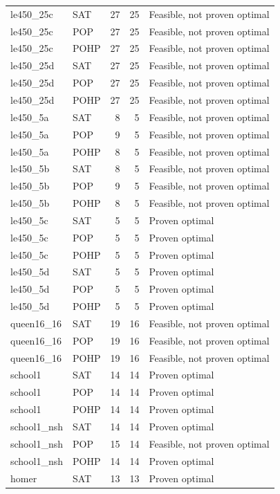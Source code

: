 \begin{longtable}{llrrl}
le450\_25c & SAT & 27 & 25 & Feasible, not proven optimal \\
le450\_25c & POP & 27 & 25 & Feasible, not proven optimal \\
le450\_25c & POHP & 27 & 25 & Feasible, not proven optimal \\
le450\_25d & SAT & 27 & 25 & Feasible, not proven optimal \\
le450\_25d & POP & 27 & 25 & Feasible, not proven optimal \\
le450\_25d & POHP & 27 & 25 & Feasible, not proven optimal \\
le450\_5a & SAT & 8 & 5 & Feasible, not proven optimal \\
le450\_5a & POP & 9 & 5 & Feasible, not proven optimal \\
le450\_5a & POHP & 8 & 5 & Feasible, not proven optimal \\
le450\_5b & SAT & 8 & 5 & Feasible, not proven optimal \\
le450\_5b & POP & 9 & 5 & Feasible, not proven optimal \\
le450\_5b & POHP & 8 & 5 & Feasible, not proven optimal \\
le450\_5c & SAT & 5 & 5 & Proven optimal \\
le450\_5c & POP & 5 & 5 & Proven optimal \\
le450\_5c & POHP & 5 & 5 & Proven optimal \\
le450\_5d & SAT & 5 & 5 & Proven optimal \\
le450\_5d & POP & 5 & 5 & Proven optimal \\
le450\_5d & POHP & 5 & 5 & Proven optimal \\
queen16\_16 & SAT & 19 & 16 & Feasible, not proven optimal \\
queen16\_16 & POP & 19 & 16 & Feasible, not proven optimal \\
queen16\_16 & POHP & 19 & 16 & Feasible, not proven optimal \\
school1 & SAT & 14 & 14 & Proven optimal \\
school1 & POP & 14 & 14 & Proven optimal \\
school1 & POHP & 14 & 14 & Proven optimal \\
school1\_nsh & SAT & 14 & 14 & Proven optimal \\
school1\_nsh & POP & 15 & 14 & Feasible, not proven optimal \\
school1\_nsh & POHP & 14 & 14 & Proven optimal \\
homer & SAT & 13 & 13 & Proven optimal \\

\end{longtable}

